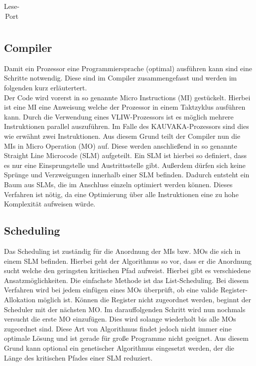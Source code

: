 \begin{table}[htbp]
\begin{minipage}{.5\textwidth}
\begin{tabular}{cccccccccccccccccc}
		\end{tabular}
		\caption{\label{lese-port}Lese-Port}
	\end{minipage}
\end{table}


\newpage
\subsection{Compiler}
Damit ein Prozessor eine Programmiersprache (optimal) ausführen kann sind eine Schritte notwendig. Diese sind im Compiler zusammengefasst und werden im folgenden kurz erläutertert.\\
Der Code wird vorerst in so genannte Micro Instructions (MI) gestückelt.  Hierbei ist eine MI eine Anweisung welche der Prozessor in einem Taktzyklus ausführen kann. Durch die Verwendung eines VLIW-Prozessors ist es möglich mehrere Instruktionen parallel auszuführen. Im Falle des KAUVAKA-Prozessors sind dies wie erwähnt zwei Instruktionen. Aus diesem Grund teilt der Compiler nun die MIs in Micro Operation (MO) auf. Diese werden anschließend in so genannte \glqq Straight Line Microcode\grqq{} (SLM) aufgeteilt. Ein SLM ist hierbei so definiert, dass es nur eine Einsprungstelle und Austrittsstelle gibt. Außerdem dürfen sich keine Sprünge und Verzweigungen innerhalb einer SLM befinden.  Dadurch entsteht ein Baum aus SLMs, die im Anschluss einzeln optimiert werden können. Dieses Verfahren ist nötig, da eine Optimierung über alle Instruktionen eine zu hohe Komplexität aufweisen würde. \cite{landskov1980local}
\subsection{Scheduling}
\label{sec:scheduling}
Das Scheduling ist zuständig für die Anordnung der MIs bzw. MOs die sich in einem SLM befinden. Hierbei geht der Algorithmus so vor, dass er die Anordnung sucht welche den geringsten kritischen Pfad aufweist. Hierbei gibt es verschiedene Ansatzmöglichkeiten. Die einfachste Methode ist das List-Scheduling. Bei diesem Verfahren wird bei jedem einfügen eines MOs überprüft, ob eine valide Register-Allokation möglich ist. Können die Register nicht zugeordnet werden, beginnt der Scheduler mit der nächsten MO. Im darauffolgenden Schritt wird nun nochmals versucht die erste MO einzufügen. Dies wird solange wiederholt bis alle MOs zugeordnet sind.\cite{landskov1980local}
Diese Art von Algorithmus findet jedoch nicht immer eine optimale Lösung und ist gerade für große Programme nicht geeignet. Aus diesem Grund kann optional ein genetischer Algorithmus eingesetzt werden, der die Länge des kritischen Pfades einer SLM reduziert.


